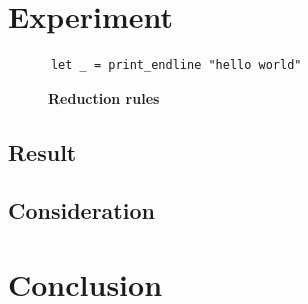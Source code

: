 \documentclass[12pt, a4paper, titlepage]{report}
\begin{document}
\chapter{Experiment}\label{chapter:experiment}
    \cite{pierce:2002}
    \begin{verbatim}
      let _ = print_endline "hello world"
    \end{verbatim}
    \begin{figure}[htbp]
      \begin{flushleft}
        \textbf{Reduction rules} \quad {}
      \end{flushleft}
      \begin{center}
        \begin{prooftree}
          \end{prooftree}
          \hfil
          \begin{prooftree}
          \end{prooftree}
      \end{center}
    \end{figure}
  \section{Result}
  \section{Consideration}

\chapter{Conclusion}\label{chapter:conclusion}



\end{document}
